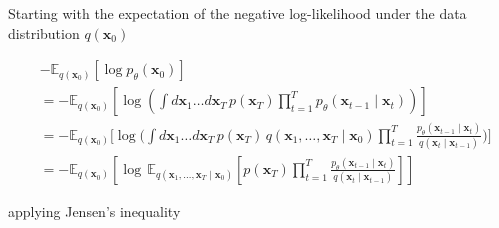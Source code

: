 Starting with the expectation of the negative log-likelihood under the data distribution $q(\mathbf{x}_0)$



\begin{align}
&- \mathbb{E}_{q(\mathbf{x}_0)} \left[ \log p_\theta(\mathbf{x}_0) \right] \\
&= - \mathbb{E}_{q(\mathbf{x}_0)} \left[ \log \left( \int d\mathbf{x}_1 \dots d\mathbf{x}_T\, p(\mathbf{x}_T) \prod_{t=1}^T p_\theta(\mathbf{x}_{t-1} \mid \mathbf{x}_t) \right) \right] \\
&= - \mathbb{E}_{q(\mathbf{x}_0)} \Bigg[ \log \Bigg( \int d\mathbf{x}_1 \dots d\mathbf{x}_T\, p(\mathbf{x}_T)\, q(\mathbf{x}_1, \dots, \mathbf{x}_T \mid \mathbf{x}_0) \prod_{t=1}^T \frac{p_\theta(\mathbf{x}_{t-1} \mid \mathbf{x}_t)}{q(\mathbf{x}_t \mid \mathbf{x}_{t-1})} \Bigg) \Bigg] \\
&= - \mathbb{E}_{q(\mathbf{x}_0)} \left[ \log \, \mathbb{E}_{q(\mathbf{x}_1,\dots,\mathbf{x}_T \mid \mathbf{x}_0)} \left[ p(\mathbf{x}_T) \prod_{t=1}^T \frac{p_\theta(\mathbf{x}_{t-1} \mid \mathbf{x}_t)}{q(\mathbf{x}_t \mid \mathbf{x}_{t-1})} \right] \right]
\end{align}







applying Jensen's inequality 


